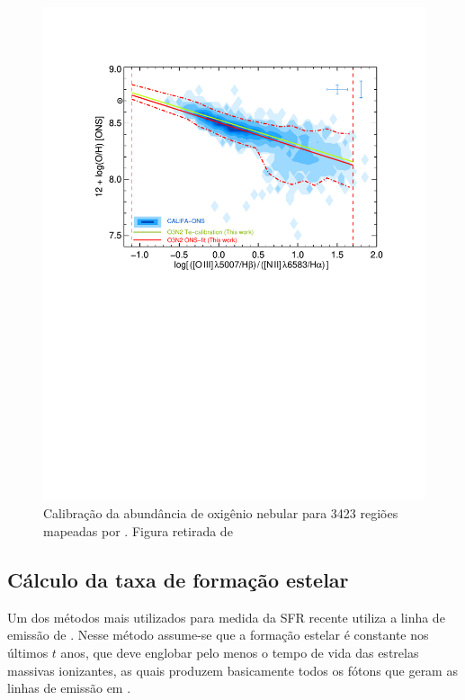 \begin{figure}
	\centering
	\includegraphics[scale=0.7, trim=2cm 13cm 2cm 3cm, clip]{figuras/O3N2_CALIFA.pdf}
	\caption[Calibração da abundância de oxigênio no gás]{Calibração da abundância de oxigênio
	nebular	para 3423 regiões \Hii mapeadas por \citet{Sanchez.etal.2013a}. Figura retirada de
	\citet{Marino.etal.2013a}}
	\label{fig:Marino2013_O3N2}
\end{figure}

\subsection{Cálculo da taxa de formação estelar}
\label{apendice:EmLinesDataCube:props:SFR}
Um dos métodos mais utilizados para medida da SFR recente utiliza a linha de emissão de \Ha. Nesse método assume-se que a formação estelar é constante nos últimos $t$ anos, que deve englobar pelo menos o tempo de vida das estrelas massivas ionizantes, as quais produzem basicamente todos os fótons que geram as linhas de emissão em \Ha.

